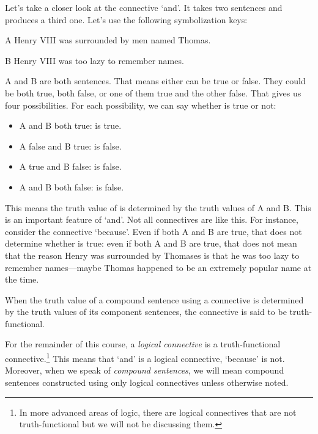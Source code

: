 Let's take a closer look at the connective `and'. It takes two sentences and 
produces a third one. Let's use the following symbolization keys:

\begin{lkey*}

\item[A]  Henry VIII was surrounded by men named Thomas. 

\item[B]  Henry VIII was too lazy to remember names.

\end{lkey*}

A and B are both sentences. That means either can be true or false. They could 
be both true, both false, or one of them true and the other false. That gives us 
four possibilities. For each possibility, we can say whether  is 
true or not:

\begin{itemize}

 \item A and B both true:  is true.

 \item A false and B true:  is false.

 \item A true and B false:   is false.

 \item A and B both false:  is false.

\end{itemize}


This means the truth value of  is determined by the truth values of 
A and B. This is an important feature of `and'. Not all connectives are like 
this. For instance, consider the connective `because'. Even if both A and B are 
true, that does not determine whether  is true: even if both A 
and B are true, that does not mean that the reason Henry was surrounded by 
Thomases is that he was too lazy to remember names---maybe Thomas happened to be 
an extremely popular name at the time.

When the truth value of a compound sentence using a connective is determined by 
the truth values of its component sentences, the connective is said to be  
truth-functional. 

For the remainder of this course, a \emph{logical connective} is a 
truth-functional connective.\footnote{In more advanced areas of logic, there are 
logical connectives that are not truth-functional but we will not be discussing 
them.} This means that `and' is a logical connective, `because' is not. Moreover, 
when we speak of \emph{compound sentences}, we will mean compound sentences 
constructed using only logical connectives unless otherwise noted. 


